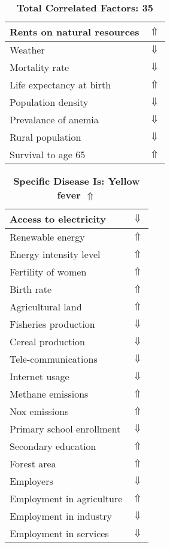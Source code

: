 \documentclass[12pt,notitlepage,oneside]{report}
\begin{document}
\begin{table}[!htb]
\begin{tabular}{|l|l|}
Rents on natural resources & $\Uparrow$\\ \hline
Weather & $\Downarrow$\\ \hline
Mortality rate & $\Downarrow$\\ \hline
Life expectancy at birth & $\Uparrow$\\ \hline
Population density & $\Downarrow$\\ \hline
Prevalance of anemia & $\Downarrow$\\ \hline
Rural population & $\Downarrow$\\ \hline
Survival to age 65 & $\Uparrow$\\ \hline
\end{tabular}
\caption*{\textbf{Total Correlated Factors: 35}}
\end{table}
\clearpage
\begin{table}[!htb]
\caption{\textbf{Specific Disease Is: Yellow fever $\Uparrow$}}
\centering
\label{Correlated Socio-economic Factors0}
\begin{tabular}{|l|l|}
\hline
Access to electricity & $\Downarrow$\\ \hline
Renewable energy & $\Uparrow$\\ \hline
Energy intensity level & $\Uparrow$\\ \hline
Fertility of women & $\Uparrow$\\ \hline
Birth rate & $\Uparrow$\\ \hline
Agricultural land & $\Uparrow$\\ \hline
Fisheries production & $\Downarrow$\\ \hline
Cereal production & $\Downarrow$\\ \hline
Tele-communications & $\Downarrow$\\ \hline
Internet usage & $\Downarrow$\\ \hline
Methane emissions & $\Uparrow$\\ \hline
Nox emissions & $\Uparrow$\\ \hline
Primary school enrollment & $\Downarrow$\\ \hline
Secondary education & $\Uparrow$\\ \hline
Forest area & $\Uparrow$\\ \hline
Employers & $\Downarrow$\\ \hline
Employment in agriculture & $\Uparrow$\\ \hline
Employment in industry & $\Downarrow$\\ \hline
Employment in services & $\Downarrow$\\ \hline

\end{tabular}
\end{table}
\end{document}
